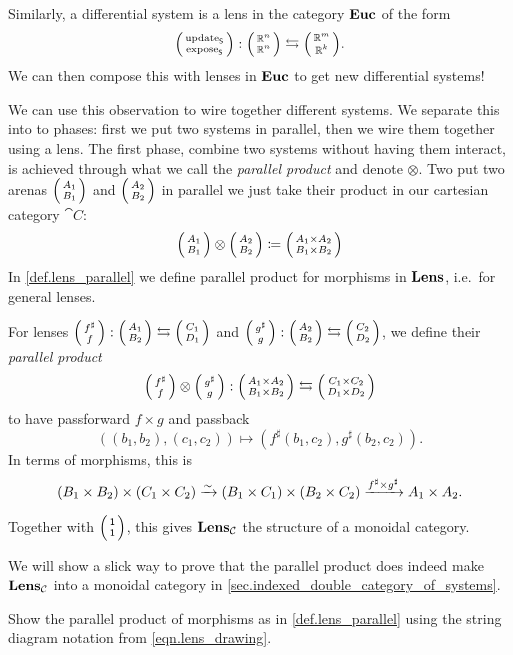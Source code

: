\documentclass[DynamicalBook]{subfiles}
\begin{document}
Similarly, a differential system is a lens in the category $\textbf{Euc}$ of the form
\[
\lens{\update{S}}{\expose{S}} : \lens{\rr^n}{\rr^n} \fromto \lens{\rr^m}{\rr^k}.
\]
We can then compose this with lenses in $\textbf{Euc}$ to get new differential systems!

We can use this observation to wire together different systems. We separate this into to phases: first we put two systems in parallel, then we wire them together using a lens. The first phase, combine two systems without having them interact, is achieved through what we call the \emph{parallel product} and denote $\otimes$. Two put two arenas $\lens{A_1}{B_1}$ and $\lens{A_2}{B_2}$ in parallel we just take their product in our cartesian category $\cat{C}$:
\[
\lens{A_1}{B_1}\otimes\lens{A_2}{B_2}\coloneqq\lens{A_1\times A_2}{B_1\times B_2}
\]
In \cref{def.lens_parallel} we define parallel product for morphisms in $\textbf{Lens}$, i.e.\ for general lenses.

\begin{definition}\label{def.lens_parallel}
  For lenses $\lens{f^{\sharp}}{f} : \lens{A_1}{B_2} \leftrightarrows \lens{C_1}{D_1}$ and
  $\lens{g^{\sharp}}{g} : \lens{A_2}{B_2} \leftrightarrows \lens{C_2}{D_2}$, we
  define their \emph{parallel product} $$\lens{f^{\sharp}}{f} \otimes
  \lens{g^{\sharp}}{g} : \lens{A_1 \times A_2}{B_1 \times B_2} \leftrightarrows
  \lens{C_1 \times C_2}{D_1 \times D_2}$$
  to have passforward $f \times g$ and passback
  $$((b_1, b_2), (c_1, c_2)) \mapsto (f^{\sharp}(b_1, c_2), g^{\sharp}(b_2, c_2)).$$
  In terms of morphisms, this is
  $$(B_1 \times B_2) \times (C_1 \times C_2) \xrightarrow{\sim} (B_1 \times C_1) \times
  (B_2 \times C_2) \xrightarrow{f^{\sharp} \times g^{\sharp}} A_1 \times A_2.$$

  Together with $\lens{\ord{1}}{\ord{1}}$, this gives $\textbf{Lens}_{\mathcal{C}}$ the
  structure of a monoidal category.
\end{definition}

\begin{remark}
  We will show a slick way to prove that the parallel product does indeed make
  $\textbf{Lens}_{\mathcal{C}}$ into a monoidal category in \cref{sec.indexed_double_category_of_systems}.
\end{remark}

\begin{exercise}
Show the parallel product of morphisms as in \cref{def.lens_parallel} using the string diagram notation from \eqref{eqn.lens_drawing}.
\end{exercise}
\end{document}

